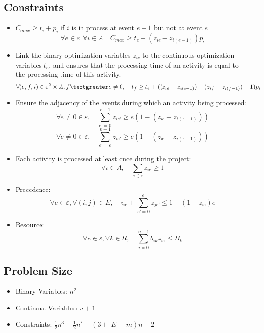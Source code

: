 \documentclass{paper}
\begin{document}
	\subsection{Constraints}
	\begin{itemize}
	  \item $C_{max} \geq t_e + p_i$ if $i$ is in process at event $e-1$ but not at event $e$
	\begin{equation}
	  \forall e \in \varepsilon,\forall i \in A \quad C_{max} \geq t_e + (z_{ie}-z_{i(e-1)})p_i
	\end{equation}
	\item Link the binary optimization variables $z_{ie}$ to the continuous optimization variables $t_e$, 
	and ensures that the processing time of an activity is equal to the processing time of this activity.
	\begin{equation}
		\forall (e,f,i) \in \varepsilon^2\times A,f \textgreater e\neq 0,\quad t_f\geq t_e+ ((z_{ie}-z_{i(e-1)})-(z_{if}-z_{i(f-1)})-1)p_i
	\end{equation}
	\item Ensure the adjacency of the events during which an activity being processed:
	\begin{equation}
		\forall e\neq 0 \in \varepsilon ,\quad \sum_{e'=0}^{e-1}z_{ie'}\geq e(1-(z_{ie}-z_{i(e-1)}))  
	\end{equation}	
	\begin{equation}
	    \forall e\neq 0 \in \varepsilon ,\quad \sum_{e'=e}^{n-1}z_{ie'}\geq e(1+(z_{ie}-z_{i(e-1)})) 
	\end{equation}	
	\item Each activity is processed at least once during the project:
	\begin{equation}
		\forall i \in A, \quad \sum_{e\in \varepsilon }z_{ie}\geq 1
	\end{equation}
	\item Precedence:
	\begin{equation}
		\forall e\in \varepsilon ,\forall (i,j)\in E,\quad z_{ie}+\sum_{e'=0}^{e}z_{je'}\leq 1+(1-z_{ie})e  
	\end{equation}
	\item Resource:
	\begin{equation}
		\forall e \in \varepsilon,\forall k \in R, \quad \sum_{i=0}^{n-1}b_{ik}z_{ie}\leq B_k 
	\end{equation}
	\end{itemize}

	\subsection{Problem Size}
	\begin{itemize}
		\item Binary Variables: $n^2$
		\item Continous Variables: $n+1$ 
		\item Constraints: $\frac{1}{2}n^3-\frac{1}{2}n^2+(3+\left\lvert E \right\rvert+m)n-2$ 
	\end{itemize}
	
\end{document}
